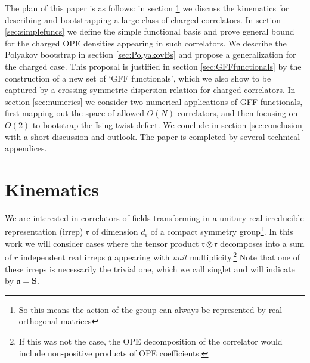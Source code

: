 \documentclass[12pt]{article}
\numberwithin{equation}{section}
\newcommand{\mbf}{\mathbf}
\newcommand{\mf}[1]{\mathfrak #1}
\begin{document}
	The plan of this paper is as follows: in section \ref{sec:kinematics} we discuss the kinematics for describing and bootstrapping a large class of charged correlators. In section \ref{sec:simplefuncs} we define the simple functional basis and prove general bound for the charged OPE densities appearing in such correlators. We describe the Polyakov bootstrap in section \ref{sec:PolyakovBs} and propose a generalization for the charged case. This proposal is justified in section \ref{sec:GFFfunctionals} by the construction of a new set of `GFF functionals', which we also show to be captured by a crossing-symmetric dispersion relation for charged correlators. In section \ref{sec:numerics} we consider two numerical applications of GFF functionals, first mapping out the space of allowed $O(N)$ correlators, and then focusing on $O(2)$ to bootstrap the Ising twist defect. We conclude in section \ref{sec:conclusion} with a short discussion and outlook. The paper is completed by several technical appendices.
	
	\section{Kinematics}
	\label{sec:kinematics}
	We are interested in correlators of fields transforming in a unitary real irreducible representation (irrep) $\mf r$ of dimension $d_{\mf r}$ of a compact symmetry group\footnote{So this means the action of the group can always be represented by real orthogonal matrices}. In this work we will consider cases where the tensor product $\mf r \otimes \mf r$ decomposes into a sum of $r$ independent real irreps $\mf a$ appearing with {\em unit} multiplicity.\footnote{If this was not the case, the OPE decomposition of the correlator would include non-positive products of OPE coefficients.} Note that one of these irreps is necessarily the trivial one, which we call singlet and will indicate by $\mf a=\mbf S$.
	
\end{document}

